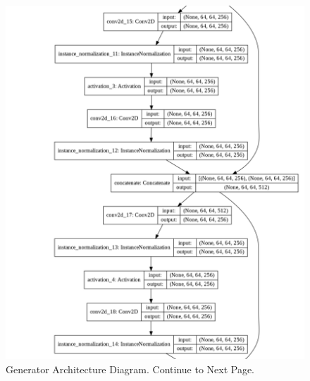 \begin{figure}[H]
        \vspace*{4cm}
	    \begin{center} 
	    \includegraphics[scale=0.40]{images/generator_2.png}
	     \caption{Generator Architecture Diagram. Continue to Next Page.}
	    \end{center}
\end{figure}

